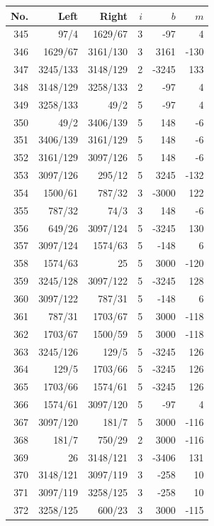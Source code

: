 \documentclass[11pt,a4paper]{article}
\begin{document}
\noindent\begin{minipage}[t]{.49\linewidth}\centering\footnotesize\setlength{\tabcolsep}{2pt}\renewcommand{\arraystretch}{1.09}
\begin{tabular*}{\linewidth}{@{}r@{\extracolsep{\fill}}rrrrr@{}}\toprule
No. & Left & Right & $i$ & $b$ & $m$\\\midrule
345 & 97/4 & 1629/67 & 3 & -97 & 4\\
346 & 1629/67 & 3161/130 & 3 & 3161 & -130\\
347 & 3245/133 & 3148/129 & 2 & -3245 & 133\\
348 & 3148/129 & 3258/133 & 2 & -97 & 4\\
349 & 3258/133 & 49/2 & 5 & -97 & 4\\
350 & 49/2 & 3406/139 & 5 & 148 & -6\\
351 & 3406/139 & 3161/129 & 5 & 148 & -6\\
352 & 3161/129 & 3097/126 & 5 & 148 & -6\\
353 & 3097/126 & 295/12 & 5 & 3245 & -132\\
354 & 1500/61 & 787/32 & 3 & -3000 & 122\\
355 & 787/32 & 74/3 & 3 & 148 & -6\\
356 & 649/26 & 3097/124 & 5 & -3245 & 130\\
357 & 3097/124 & 1574/63 & 5 & -148 & 6\\
358 & 1574/63 & 25 & 5 & 3000 & -120\\
359 & 3245/128 & 3097/122 & 5 & -3245 & 128\\
360 & 3097/122 & 787/31 & 5 & -148 & 6\\
361 & 787/31 & 1703/67 & 5 & 3000 & -118\\
362 & 1703/67 & 1500/59 & 5 & 3000 & -118\\
363 & 3245/126 & 129/5 & 5 & -3245 & 126\\
364 & 129/5 & 1703/66 & 5 & -3245 & 126\\
365 & 1703/66 & 1574/61 & 5 & -3245 & 126\\
366 & 1574/61 & 3097/120 & 5 & -97 & 4\\
367 & 3097/120 & 181/7 & 5 & 3000 & -116\\
368 & 181/7 & 750/29 & 2 & 3000 & -116\\
369 & 26 & 3148/121 & 3 & -3406 & 131\\
370 & 3148/121 & 3097/119 & 3 & -258 & 10\\
371 & 3097/119 & 3258/125 & 3 & -258 & 10\\
372 & 3258/125 & 600/23 & 3 & 3000 & -115\\

\end{tabular*}
\end{minipage}
\end{document}

